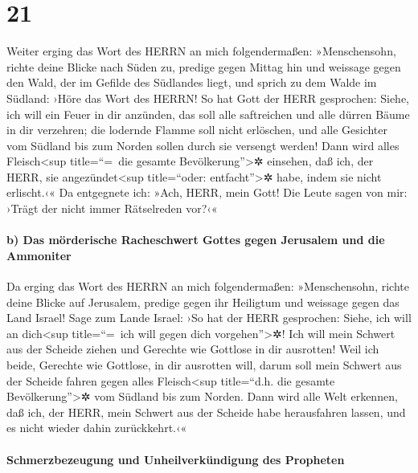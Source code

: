 \hypertarget{section-20}{%
\section{21}\label{section-20}}

Weiter erging das Wort des HERRN an mich folgendermaßen:
»Menschensohn, richte deine Blicke nach Süden zu, predige
gegen Mittag hin und weissage gegen den Wald, der im Gefilde des
Südlandes liegt, und sprich zu dem Walde im Südland: ›Höre
das Wort des HERRN! So hat Gott der HERR gesprochen: Siehe, ich will ein
Feuer in dir anzünden, das soll alle saftreichen und alle dürren Bäume
in dir verzehren; die lodernde Flamme soll nicht erlöschen, und alle
Gesichter vom Südland bis zum Norden sollen durch sie versengt werden!
Dann wird alles Fleisch\textless sup title=``=~die gesamte
Bevölkerung''\textgreater✲ einsehen, daß ich, der HERR, sie
angezündet\textless sup title=``oder: entfacht''\textgreater✲ habe,
indem sie nicht erlischt.‹« Da entgegnete ich: »Ach, HERR,
mein Gott! Die Leute sagen von mir: ›Trägt der nicht immer Rätselreden
vor?‹«

\hypertarget{b-das-muxf6rderische-racheschwert-gottes-gegen-jerusalem-und-die-ammoniter}{%
\paragraph{b) Das mörderische Racheschwert Gottes gegen Jerusalem und
die
Ammoniter}\label{b-das-muxf6rderische-racheschwert-gottes-gegen-jerusalem-und-die-ammoniter}}

Da erging das Wort des HERRN an mich folgendermaßen:
»Menschensohn, richte deine Blicke auf Jerusalem, predige
gegen ihr Heiligtum und weissage gegen das Land Israel!
Sage zum Lande Israel: ›So hat der HERR gesprochen: Siehe,
ich will an dich\textless sup title=``=~ich will gegen dich
vorgehen''\textgreater✲! Ich will mein Schwert aus der Scheide ziehen
und Gerechte wie Gottlose in dir ausrotten! Weil ich
beide, Gerechte wie Gottlose, in dir ausrotten will, darum soll mein
Schwert aus der Scheide fahren gegen alles Fleisch\textless sup
title=``d.h. die gesamte Bevölkerung''\textgreater✲ vom Südland bis zum
Norden. Dann wird alle Welt erkennen, daß ich, der HERR,
mein Schwert aus der Scheide habe herausfahren lassen, und es nicht
wieder dahin zurückkehrt.‹«

\hypertarget{schmerzbezeugung-und-unheilverkuxfcndigung-des-propheten}{%
\paragraph{Schmerzbezeugung und Unheilverkündigung des
Propheten}\label{schmerzbezeugung-und-unheilverkuxfcndigung-des-propheten}}

